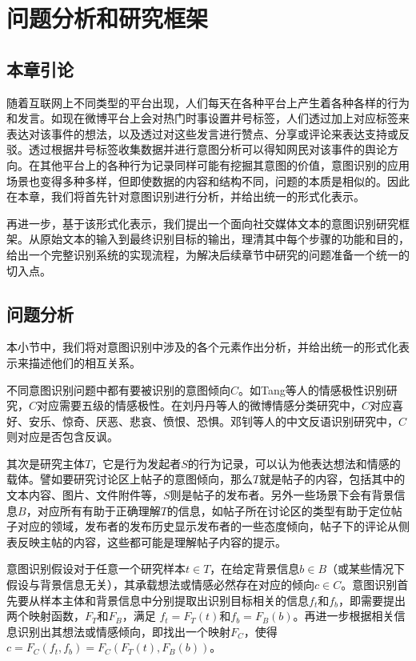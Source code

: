 \chapter{问题分析和研究框架}
\label{cha:problem_framework}

\section{本章引论}

随着互联网上不同类型的平台出现，人们每天在各种平台上产生着各种各样的行为和发言。如现在微博平台上会对热门时事设置井号标签，人们透过加上对应标签来表达对该事件的想法，以及透过对这些发言进行赞点、分享或评论来表达支持或反驳。透过根据井号标签收集数据并进行意图分析可以得知网民对该事件的舆论方向。在其他平台上的各种行为记录同样可能有挖掘其意图的价值，意图识别的应用场景也变得多种多样，但即使数据的内容和结构不同，问题的本质是相似的。因此在本章，我们将首先针对意图识别进行分析，并给出统一的形式化表示。

再进一步，基于该形式化表示，我们提出一个面向社交媒体文本的意图识别研究框架。从原始文本的输入到最终识别目标的输出，理清其中每个步骤的功能和目的，给出一个完整识别系统的实现流程，为解决后续章节中研究的问题准备一个统一的切入点。

\section{问题分析}

本小节中，我们将对意图识别中涉及的各个元素作出分析，并给出统一的形式化表示来描述他们的相互关系。

不同意图识别问题中都有要被识别的意图倾向$C$。如Tang等人\cite{tang2015learning}的情感极性识别研究，$C$对应需要五级的情感极性。在刘丹丹等人\cite{刘丹丹2015基于}的微博情感分类研究中，$C$对应喜好、安乐、惊奇、厌恶、悲哀、愤恨、恐惧。邓钊等人\cite{2015面向微博的中文反语识别研究}的中文反语识别研究中，$C$则对应是否包含反讽。

其次是研究主体$T$，它是行为发起者$S$的行为记录，可以认为他表达想法和情感的载体。譬如要研究讨论区上帖子的意图倾向，那么$T$就是帖子的内容，包括其中的文本内容、图片、文件附件等，$S$则是帖子的发布者。另外一些场景下会有背景信息$B$，对应所有有助于正确理解$T$的信息，如帖子所在讨论区的类型有助于定位帖子对应的领域，发布者的发布历史显示发布者的一些态度倾向，帖子下的评论从侧表反映主帖的内容，这些都可能是理解帖子内容的提示。

意图识别假设对于任意一个研究样本$t \in T$，在给定背景信息$b \in B$（或某些情况下假设与背景信息无关），其承载想法或情感必然存在对应的倾向$c \in C$。意图识别首先要从样本主体和背景信息中分别提取出识别目标相关的信息$f_t$和$f_b$，即需要提出两个映射函数，$F_T$和$F_B$，满足 $f_t=F_T(t)$和$f_b=F_B(b)$。再进一步根据相关信息识别出其想法或情感倾向，即找出一个映射$F_C$，使得 $c=F_C(f_t, f_b)=F_C(F_T(t), F_B(b))$。

